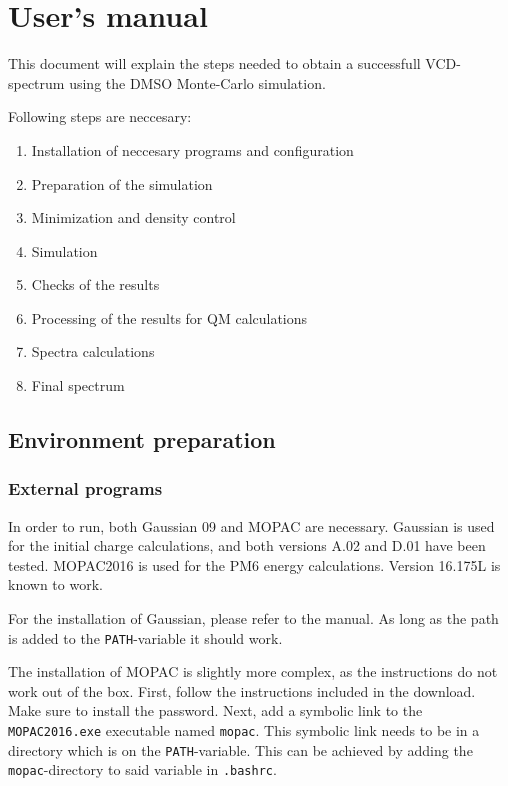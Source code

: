 \documentclass[a4paper,fleqn]{report}
\begin{document}
	
	\chapter{User's manual}

	
	This document will explain the steps needed to obtain a successfull VCD-spectrum using the DMSO Monte-Carlo simulation.
	
	Following steps are neccesary:
	\begin{enumerate}
		\setlength{\itemsep}{-1pt}
		\setlength{\parsep}{-1pt}
		\item Installation of neccesary programs and configuration
		\item Preparation of the simulation
		\item Minimization and density control
		\item Simulation
		\item Checks of the results
		\item Processing of the results for QM calculations
		\item Spectra calculations
		\item Final spectrum
	\end{enumerate}
	
	\section{Environment preparation}
	
	\subsection{External programs}
	In order to run, both Gaussian 09 and MOPAC are necessary. Gaussian is used 
	for the initial charge calculations, and both versions A.02 and D.01 have 
	been tested.
	MOPAC2016 is used for the PM6 energy calculations. Version 16.175L is known 
	to work.
	
	For the installation of Gaussian, please refer to the manual. As long as 
	the path is added to the \verb|PATH|-variable it should work.
	
	The installation of MOPAC is slightly more complex, as the instructions do 
	not work out of the box.
	First, follow the instructions included in the download. Make sure to 
	install the password.
	Next, add a symbolic link to the \verb|MOPAC2016.exe| executable named 
	\verb|mopac|.
	This symbolic link needs to be in a directory which is on the 
	\verb|PATH|-variable. This can be achieved by adding the 
	\verb|mopac|-directory to said variable in \verb|.bashrc|.
	
\end{document}
